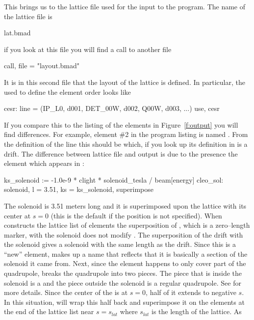 {{{{{{This brings us to the lattice file used for the input to the program.
The name of the lattice file is 
  \begin{example}
  lat.bmad
  \end{example} 
if you look at this file you will find a call to another file
  \begin{example}
  call, file = "layout.bmad"
  \end{example}
It is in this second file
that the layout of the lattice is defined. In particular, the  used
to define the element order looks like
\begin{example}
  cesr: line = (IP_L0, d001, DET_00W, d002, Q00W, d003, ...)
  use, cesr
\end{example}
If you compare this to the listing of the elements in
Figure~\ref{f:output} you will find differences. For example, element
\#2 in the program listing is named . From the
definition of the  line this should be  which, if
you look up its definition in  is a drift.  The
difference between lattice file and output is due to the presence
the  element which appears in :
\begin{example}
  ks_solenoid    := -1.0e-9 * clight * solenoid_tesla / beam[energy]
  cleo_sol: solenoid, l = 3.51, ks = ks_solenoid, superimpose 
\end{example}
The solenoid is 3.51 meters long
and it is superimposed upon the lattice with its center at $s = 0$ (this
is the default if the position is not specified). 
When  constructs the lattice list of elements
the superposition of , which is a zero--length marker, with the
solenoid does not modify . The superposition of the
 drift with the solenoid gives a solenoid with the same
length as the drift. Since this is a ``new'' element, 
makes up a name that reflects that it is basically a section of the
solenoid it came from.  Next, since the  element happens to
only cover
part of the  quadrupole,  breaks the
quadrupole into two pieces. The piece that is inside the solenoid is a
 and the piece outside the solenoid is a regular
quadrupole. See  for more details. Since the
center of the  is at $s = 0$, half of it extends to
negative $s$. In this situation,  will wrap this half
back and superimpose it on the elements at the end of the lattice list
near $s = s_{lat}$ where $s_{lat}$ is the length of the lattice.  As
}}}}}}
